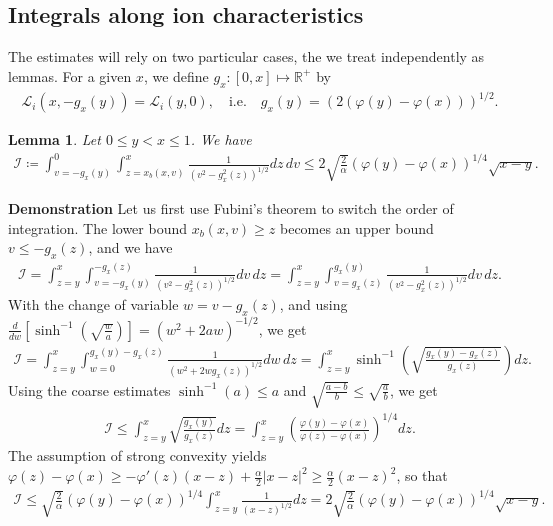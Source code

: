 \documentclass{article}
\newtheorem{lem}{Lemma}[section]
\numberwithin{equation}{section}
\newcommand{\myproof}[1]{
	\noindent \textbf{Demonstration}
	{\small	#1 \hfill \qedsymbol}
}
\begin{document}
\subsection{Integrals along ion characteristics}

The estimates will rely on two particular cases, the we treat independently as lemmas. For a given $x$, we define $g_x : [0,x] \mapsto \mathbb{R}^{+}$ by
\begin{align*}
	\mathcal{L}_i(x,-g_x(y)) = \mathcal{L}_i(y,0), \quad \text{i.e.} \quad g_x(y) = \left(2\left(\varphi(y) - \varphi(x)\right)\right)^{1/2}.
\end{align*}

\begin{lem}\label{lem:upperbound_ni_endchar}
	Let $0\leqslant y < x \leqslant 1$. We have
	\begin{align*}
		\mathcal{I} \coloneqq \int_{v=-g_x(y)}^{0} \int_{z = x_b(x,v)}^{x} \frac{1}{\left(v^2-g_x^2(z)\right)^{1/2}} dz\,dv \leqslant 2 \sqrt{\frac{2}{\alpha}}\left(\varphi(y) - \varphi(x)\right)^{1/4} \sqrt{x-y}. 
	\end{align*}
\end{lem}

\myproof{
	Let us first use Fubini's theorem to switch the order of integration. The lower bound $x_b(x,v) \geqslant z$ becomes an upper bound $v \leqslant -g_x(z)$, and we have
	\begin{align*}
		\mathcal{I} 
		= \int_{z=y}^{x} \int_{v = -g_x(y)}^{-g_x(z)} \frac{1}{\left(v^2-g_x^2(z)\right)^{1/2}} dv\,dz 
		= \int_{z=y}^{x} \int_{v = g_x(z)}^{g_x(y)} \frac{1}{\left(v^2-g_x^2(z)\right)^{1/2}} dv\,dz.
	\end{align*} 
	With the change of variable $w = v - g_x(z)$, and using $\frac{d}{dw} \left[\sinh^{-1}\left(\sqrt{\frac{w}{a}}\right)\right] = \left(w^2 + 2aw\right)^{-1/2}$, we get
	\begin{align*}
		\mathcal{I} 
		= \int_{z=y}^{x} \int_{w = 0}^{g_x(y)-g_x(z)} \frac{1}{\left(w^2 + 2 w g_x(z)\right)^{1/2}} dw\,dz
		= \int_{z=y}^{x} \sinh^{-1}\left(\sqrt{\frac{g_x(y) -g_x(z)}{g_x(z)}}\right) dz.
	\end{align*}
	Using the coarse estimates $\sinh^{-1}(a) \leqslant a$ and $\sqrt{\frac{a-b}{b}} \leqslant \sqrt{\frac{a}{b}}$, we get
	\begin{align*}
		\mathcal{I} \leqslant \int_{z=y}^{x} \sqrt{\frac{g_x(y)}{g_x(z)}} dz = \int_{z=y}^{x} \left(\frac{\varphi(y) - \varphi(x)}{\varphi(z) - \varphi(x)}\right)^{1/4} dz.
	\end{align*}
	The assumption of strong convexity yields $\varphi(z) - \varphi(x) \geqslant - \varphi'(z) (x - z) + \frac{\alpha}{2} |x - z|^2 \geqslant \frac{\alpha}{2} (x - z)^2$, so that 
	\begin{align*}
		\mathcal{I} 
		\leqslant \sqrt{\frac{2}{\alpha}}\left(\varphi(y) - \varphi(x)\right)^{1/4} \int_{z=y}^{x} \frac{1}{\left(x - z\right)^{1/2}} dz 
		= 2 \sqrt{\frac{2}{\alpha}}\left(\varphi(y) - \varphi(x)\right)^{1/4} \sqrt{x-y}.
	\end{align*}
}
\end{document}
